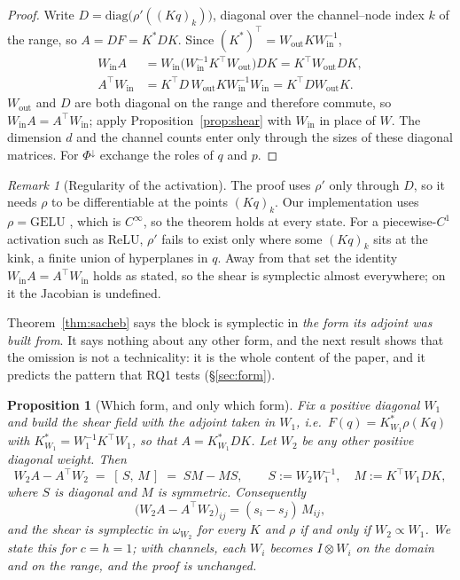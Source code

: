 \documentclass[11pt]{article}
\newtheorem{proposition}[theorem]{Proposition}
\theoremstyle{definition}
\theoremstyle{remark}
\newtheorem{remark}[theorem]{Remark}
\begin{document}
\begin{proof}
Write $D=\mathrm{diag}\big(\rho'((Kq)_k)\big)$, diagonal over the channel--node
index $k$ of the range, so $A=DF=K^{*}DK$. Since
$(K^{*})^{\top}=W_{\mathrm{out}}KW_{\mathrm{in}}^{-1}$,
\begin{align*}
W_{\mathrm{in}}A &= W_{\mathrm{in}}\big(W_{\mathrm{in}}^{-1}K^{\top}W_{\mathrm{out}}\big)DK
= K^{\top}W_{\mathrm{out}}DK,\\
A^{\top}W_{\mathrm{in}} &= K^{\top}D\,W_{\mathrm{out}}KW_{\mathrm{in}}^{-1}W_{\mathrm{in}}
= K^{\top}DW_{\mathrm{out}}K .
\end{align*}
$W_{\mathrm{out}}$ and $D$ are both diagonal on the range and therefore commute,
so $W_{\mathrm{in}}A=A^{\top}W_{\mathrm{in}}$; apply
Proposition~\ref{prop:shear} with $W_{\mathrm{in}}$ in place of $W$. The
dimension $d$ and the channel counts enter only through the sizes of these
diagonal matrices. For $\Phi^{\downarrow}$ exchange the roles of $q$ and $p$.
\end{proof}

\begin{remark}[Regularity of the activation]
\label{rem:activation}
The proof uses $\rho'$ only through $D$, so it needs $\rho$ to be differentiable
at the points $(Kq)_k$. Our implementation uses $\rho=\mathrm{GELU}$ \citep{hendrycks2016gelu}, which is
$C^\infty$, so the theorem holds at every state. For a piecewise-$C^1$
activation such as ReLU, $\rho'$ fails to exist only where some $(Kq)_k$ sits
at the kink, a finite union of hyperplanes in $q$. Away from that set the
identity $W_{\mathrm{in}}A=A^{\top}W_{\mathrm{in}}$ holds as stated, so the
shear is symplectic almost everywhere; on it the Jacobian is undefined.
\end{remark}

Theorem~\ref{thm:sacheb} says the block is symplectic in \emph{the form its
adjoint was built from}. It says nothing about any other form, and the next
result shows that the omission is not a technicality: it is the whole content of
the paper, and it predicts the pattern that RQ1 tests (\S\ref{sec:form}).

\begin{proposition}[Which form, and only which form]
\label{prop:necessity}
Fix a positive diagonal $W_1$ and build the shear field with the adjoint taken in
$W_1$, i.e.\ $F(q)=K^{*}_{W_1}\rho(Kq)$ with $K^{*}_{W_1}=W_1^{-1}K^{\top}W_1$,
so that $A=K^{*}_{W_1}DK$. Let $W_2$ be any other positive diagonal weight. Then
\begin{equation}
W_2A - A^{\top}W_2 \;=\; [\,S,\,M\,] \;=\; SM-MS,
\qquad S := W_2W_1^{-1},\quad M := K^{\top}W_1DK ,
\label{eq:commutator}
\end{equation}
where $S$ is diagonal and $M$ is symmetric. Consequently
\begin{equation}
\big(W_2A-A^{\top}W_2\big)_{ij} = (s_i-s_j)\,M_{ij},
\label{eq:entrywise}
\end{equation}
and the shear is symplectic in $\omega_{W_2}$ \emph{for every} $K$ and $\rho$ if
and only if $W_2\propto W_1$. We state this for $c=h=1$; with channels, each
$W_i$ becomes $I\otimes W_i$ on the domain and on the range, and the proof is
unchanged.
\end{proposition}
\end{document}
